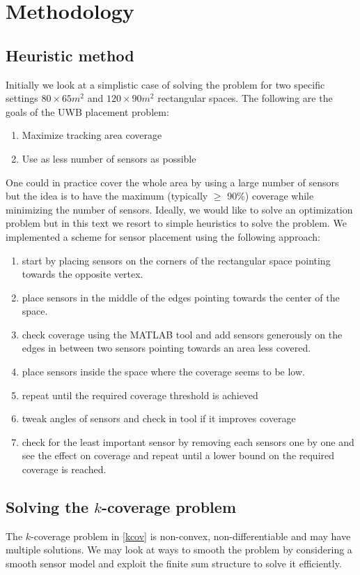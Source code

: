 \documentclass{article}
\begin{document}
\section{Methodology}

\subsection{Heuristic method}
Initially we look at a simplistic case of solving the problem for two specific settings $80 \times 65 m^2$ and  $120 \times 90 m^2$ rectangular spaces. The following are the goals of the UWB placement problem:
\begin{enumerate}
	\item Maximize tracking area coverage
	\item Use as less number of sensors as possible
\end{enumerate}

One could in practice cover the whole area by using a large number of sensors but the idea is to have the maximum (typically $\geq$ 90\%) coverage while minimizing the number of sensors.
Ideally, we would like to solve an optimization problem but in this text we resort to simple heuristics to solve the problem. We implemented a scheme for sensor placement using the following approach:
\begin{enumerate}
	\item start by placing sensors on the corners of the rectangular space pointing towards the opposite vertex.
	\item place sensors in the middle of the edges pointing towards the center of the space.
	\item check coverage using the MATLAB tool and add sensors generously on the edges in between two sensors pointing towards an area less covered.
	\item place sensors inside the space where the coverage seems to be low.
	\item repeat until the required coverage threshold is achieved
	\item tweak angles of sensors and check in tool if it improves coverage
	\item check for the least important sensor by removing each sensors one by one and see the effect on coverage and repeat until a lower bound on the required coverage is reached.
\end{enumerate}

\subsection{Solving the $k$-coverage problem}
The $k$-coverage problem in \ref{kcov} is non-convex, non-differentiable and may have multiple solutions. We may look at ways to smooth the problem by considering a smooth sensor model and exploit the finite sum structure to solve it efficiently.
\end{document}
